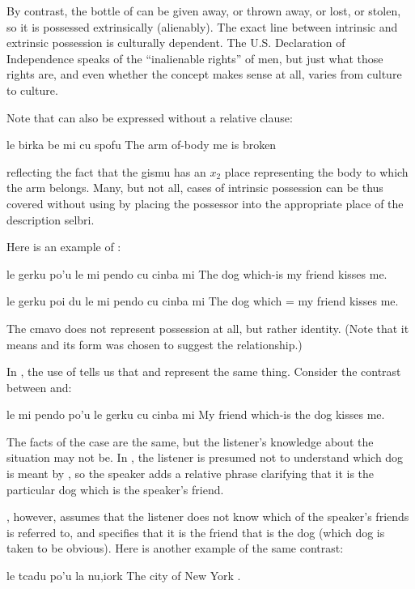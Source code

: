 By contrast, the bottle of 
    can be given away, or thrown away, or lost, or stolen, so it is
    possessed extrinsically (alienably). The exact line between
    intrinsic and extrinsic possession is culturally dependent. The
    U.S. Declaration of Independence speaks of the ``inalienable
    rights'' of men, but just what those rights are, and even
    whether the concept makes sense at all, varies from culture to
    culture.

Note that  can also be
    expressed without a relative clause:
\begin{example}
le birka be mi cu spofu\n
The arm of-body me is broken
\end{example}

{\noindent}reflecting the fact that the gismu  has an $x_2$ place
    representing the body to which the arm belongs. Many, but not
    all, cases of intrinsic possession can be thus covered without
    using  by placing the possessor into the appropriate
    place of the description selbri. 

Here is an example of :
\begin{example}
le gerku po'u le mi pendo cu cinba mi\n
The dog which-is my friend kisses me.
\end{example}

\begin{example}
le gerku poi du le mi pendo cu cinba mi\n
The dog which = my friend kisses me.
\end{example}

The cmavo  does not represent possession at all, but
    rather identity. (Note that it means  and its form
    was chosen to suggest the relationship.) 

In , the use of 
    tells us that  and  represent the
    same thing. Consider the contrast between  and:
\begin{example}
le mi pendo po'u le gerku cu cinba mi\n
My friend which-is the dog kisses me.
\end{example}

The facts of the case are the same, but the listener's
    knowledge about the situation may not be. In , the listener is presumed not to
    understand which dog is meant by , so the speaker
    adds a relative phrase clarifying that it is the particular dog
    which is the speaker's friend. 

, however, assumes that the
    listener does not know which of the speaker's friends is
    referred to, and specifies that it is the friend that is the
    dog (which dog is taken to be obvious). Here is another example
    of the same contrast:
\begin{example}
le tcadu po'u la nu,iork\n
The city of New York .
\end{example}

